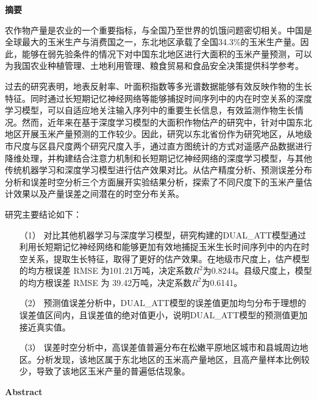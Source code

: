 \cleardoublepage{}
\begin{center}
    \bfseries {} 摘要
\end{center}

\par 农作物产量是农业的一个重要指标，与全国乃至世界的饥饿问题密切相关。中国是全球最大的玉米生产与消费国之一，东北地区承载了全国34.3\%的玉米生产量。因此，能够在弱先验条件的情况下对中国东北地区进行大面积的玉米产量预测，可以为我国农业种植管理、土地利用管理、粮食贸易和食品安全决策提供科学参考。

\par 过去的研究表明，地表反射率、叶面积指数等多光谱数据能够有效反映作物的生长特征。同时通过长短期记忆神经网络等能够捕捉时间序列中的内在时空关系的深度学习模型，可以自适应地关注输入序列中的重要生长信息，有效监测作物生长情况。然而，近年来在基于深度学习模型的大面积作物估产的研究中，针对中国东北地区开展玉米产量预测的工作较少。因此，研究以东北省份作为研究地区，从地级市尺度与区县尺度两个研究尺度入手，通过直方图统计的方式对遥感产品数据进行降维处理，并构建结合注意力机制和长短期记忆神经网络的深度学习模型，与其他传统机器学习和深度学习模型进行估产效果对比。从估产精度分析、预测误差分布分析和误差时空分析三个方面展开实验结果分析，探索了不同尺度下的玉米产量估计效果以及产量误差之间潜在的时空分布关系。

\par 研究主要结论如下：

\begin{itemize}
  \item [（1）] 对比其他机器学习与深度学习模型，研究构建的DUAL\_ATT模型通过利用长短期记忆神经网络和能够更加有效地捕捉玉米生长时间序列中的内在时空关系，提取生长特征，取得了更好的估产效果。在地级市尺度上，估产模型的均方根误差 RMSE 为101.21万吨，决定系数$R^2$为0.8244。县级尺度上，模型的均方根误差 RMSE 为 39.42万吨，决定系数$R^2$为0.6141。
  \item [（2）] 预测值误差分析中，DUAL\_ATT模型的误差值更加均匀分布于理想的误差值区间内，且误差值的绝对值更小，说明DUAL\_ATT模型的预测值更加接近真实值。
  \item [（3）] 误差时空分析中，高误差值普遍分布在松嫩平原地区城市和县城周边地区。分析发现，该地区属于东北地区的玉米高产量地区，且高产量样本比例较少，导致了该地区玉米产量的普遍低估现象。
\end{itemize}

\cleardoublepage{}
\begin{center}
    \bfseries {} Abstract
\end{center}

